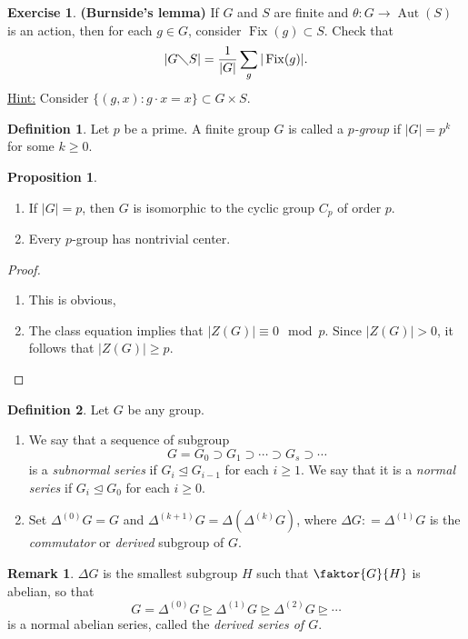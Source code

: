 \documentclass[10pt,letterpaper,cm]{nupset}
\theoremstyle{definition}
\newtheorem*{definition}{Definition}
\newtheorem{remark}{Remark}
\newtheorem{prop}{Proposition}
\newtheorem{exercise}{Exercise}
\newcommand{\1}{\mathbf{1}}
\newcommand{\0}{\vec 0}
\DeclareMathOperator{\aut}{Aut}
\DeclareMathOperator{\fix}{Fix}
\begin{document}
\begin{exercise}{\textbf{(Burnside's lemma)}} If $G$ and $S$ are finite and $\theta : G \to \aut(S)$ is an action, then for each $g\in G$, consider $\fix(g) \subset S$. Check that $$|G \diagdown S| = \frac{1}{|G|} \sum_g |\fix(g)|.$$ \underline{Hint:} Consider $\{(g,x): g \cdot x=x\} \subset G \times S$.
\end{exercise}
 
\begin{definition}
Let $p$ be a prime. A finite group $G$ is called a \textit{$p$-group} if $|G| = p^k$ for some $k \geq 0$. 
\end{definition}

\begin{prop}  $ $
\begin{enumerate}
\item If $|G| = p$, then $G$ is isomorphic to the cyclic group $C_p$ of order $p$.
\item Every $p$-group has nontrivial center.
\end{enumerate}
\end{prop}
\begin{proof} $ $
\begin{enumerate}
\item This is obvious,
\item The class equation implies that $|Z(G)| \equiv 0 \mod p$. Since $|Z(G)|>0$, it follows that $|Z(G)|\geq p$.
\end{enumerate}
\end{proof}

\begin{definition} Let $G$ be any group.
\begin{enumerate}
\item We say that a sequence of subgroup $$  G= G_0 \supset G_1 \supset \cdots \supset G_s \supset \cdots    $$ is a \textit{subnormal series} if $G_i \unlhd G_{i-1}$ for each $i\geq 1$. We say that it is a \textit{normal series} if $G_i \unlhd G_0$ for each $i\geq 0$. 
\item Set $\Delta^{(0)}G =G$ and $\Delta^{(k+1)}G = \Delta(\Delta^{(k)}G)$, where $\Delta G: = \Delta^{(1)} G$ is the \textit{commutator} or \textit{derived} subgroup of $G$.
\end{enumerate}
\end{definition}

\begin{remark}
$\Delta G$ is the smallest subgroup $H$ such that $\faktor{G}{H}$ is abelian, so that $$G = \Delta^{(0)}G \unrhd \Delta^{(1)}G \unrhd \Delta^{(2)}G \unrhd \cdots $$ is a normal abelian series, called the \textit{derived series of $G$}.
\end{remark}
\end{document}

